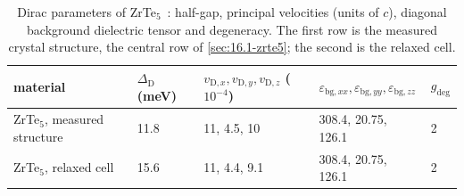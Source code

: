 \begin{table}[t]
  \centering
  \caption{Dirac parameters of ZrTe$_5$~\cite[Tables~1 and 2]{geilhufe2020dirac}: half-gap, principal velocities (units of $c$), diagonal background dielectric tensor and degeneracy. The first row is the measured crystal structure, the central row of \cref{sec:16.1-zrte5}; the second is the relaxed cell.}
  \label{tab:E20-dirac}
  \small
  \begin{tabular}{lllll}
    \toprule
    material & $\Delta_{\mathrm{D}}$ (meV) & $v_{\mathrm{D},x}, v_{\mathrm{D},y}, v_{\mathrm{D},z}$ ($10^{-4}$) & $\varepsilon_{\mathrm{bg},xx}, \varepsilon_{\mathrm{bg},yy}, \varepsilon_{\mathrm{bg},zz}$ & $g_{\mathrm{deg}}$ \\
    \midrule
    ZrTe$_5$, measured structure & 11.8 & 11, 4.5, 10 & 308.4, 20.75, 126.1 & 2 \\
    ZrTe$_5$, relaxed cell & 15.6 & 11, 4.4, 9.1 & 308.4, 20.75, 126.1 & 2 \\
    \bottomrule
  \end{tabular}
\end{table}

